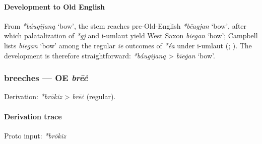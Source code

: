 \documentclass[
  british,
  a4paper,
]{article}
\providecommand{\Recon}[1]{\emph{*#1}}
\begin{document}
\paragraph{Development to Old
English}\label{development-to-old-english-10}

From \Recon{báugijaną} `bow', the stem reaches pre-Old-English
\Recon{bēagjan} `bow', after which palatalization of \emph{*gj} and
i-umlaut yield West Saxon \emph{biegan} `bow'; Campbell lists
\emph{biegan} `bow' among the regular \emph{ie} outcomes of \emph{*éa}
under i-umlaut (;
). The development is
therefore straightforward: \emph{*báugijaną} \textgreater{}
\emph{bīeġan} `bow'.

\subsubsection{\texorpdfstring{breeches --- OE
\emph{brēċ}}{breeches --- OE brēċ}}\label{breeches-oe-brux113ux10b}

Derivation: \emph{*brōkiz} \textgreater{} \emph{brēċ} (regular).

\paragraph{Derivation trace}\label{derivation-trace-12}

Proto input: \emph{*brōkiz}

\begingroup
\setlength{\fboxsep}{6pt}
\end{document}
